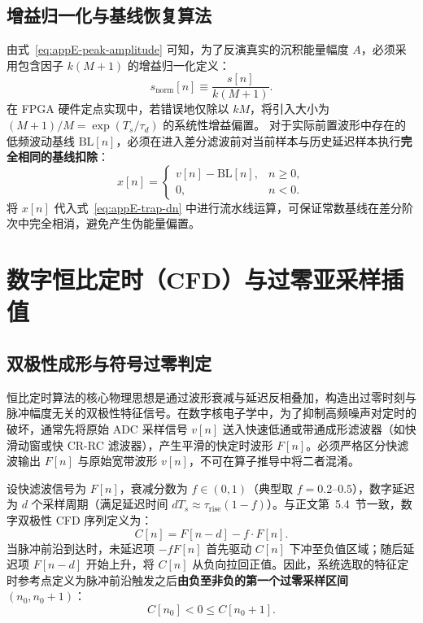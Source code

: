 \subsection{增益归一化与基线恢复算法}

由式~\eqref{eq:appE-peak-amplitude} 可知，为了反演真实的沉积能量幅度 $A$，必须采用包含因子 $k(M+1)$ 的增益归一化定义：
\begin{equation}\label{eq:appE-snorm}
s_{\mathrm{norm}}[n] \equiv \frac{s[n]}{k(M + 1)}.
\end{equation}
在 FPGA 硬件定点实现中，若错误地仅除以 $k M$，将引入大小为 $(M+1)/M = \exp(T_s/\tau_d)$ 的系统性增益偏置。
对于实际前置波形中存在的低频波动基线 $\mathrm{BL}[n]$，必须在进入差分滤波前对当前样本与历史延迟样本执行\textbf{完全相同的基线扣除}：
\begin{equation}\label{eq:appE-baseline-sub}
x[n] = \begin{cases} v[n] - \mathrm{BL}[n], & n \ge 0, \\ 0, & n < 0. \end{cases}
\end{equation}
将 $x[n]$ 代入式~\eqref{eq:appE-trap-dn} 中进行流水线运算，可保证常数基线在差分阶次中完全相消，避免产生伪能量偏置。

\section{数字恒比定时（CFD）与过零亚采样插值}\label{sec:appE-cfd}

\subsection{双极性成形与符号过零判定}

恒比定时算法的核心物理思想是通过波形衰减与延迟反相叠加，构造出过零时刻与脉冲幅度无关的双极性特征信号。在数字核电子学中，为了抑制高频噪声对定时的破坏，通常先将原始 ADC 采样信号 $v[n]$ 送入快速低通或带通成形滤波器（如快滑动窗或快 CR-RC 滤波器），产生平滑的快定时波形 $F[n]$。必须严格区分快滤波输出 $F[n]$ 与原始宽带波形 $v[n]$，不可在算子推导中将二者混淆。

设快滤波信号为 $F[n]$，衰减分数为 $f \in (0, 1)$（典型取 $f = 0.2$--$0.5$），数字延迟为 $d$ 个采样周期（满足延迟时间 $d T_s \approx \tau_{\mathrm{rise}}(1 - f)$）。与正文第~5.4~节一致，数字双极性 CFD 序列定义为：
\begin{equation}\label{eq:appE-cfd-bipolar}
C[n] = F[n - d] - f \cdot F[n].
\end{equation}
当脉冲前沿到达时，未延迟项 $-f F[n]$ 首先驱动 $C[n]$ 下冲至负值区域；随后延迟项 $F[n-d]$ 开始上升，将 $C[n]$ 从负向拉回正值。因此，系统选取的特征定时参考点定义为脉冲前沿触发之后\textbf{由负至非负的第一个过零采样区间} $(n_0, n_0+1)$：
\begin{equation}\label{eq:appE-zero-cross-condition}
C[n_0] < 0 \le C[n_0 + 1].
\end{equation}

